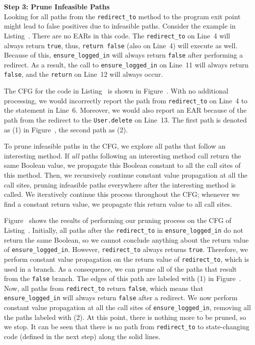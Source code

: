\noindent\textbf{Step 3: Prune Infeasible Paths}\\
Looking for all paths from the \texttt{redirect\_to} method to the program
exit point might lead to false positives due to infeasible paths. Consider
the example in Listing~. There are no EARs in this
code. The \texttt{redirect\_to} on Line~4 will always return \texttt{true},
thus, \texttt{return false} (also on Line~4) will execute as well. Because
of this, \texttt{ensure\_logged\_in} will always return \texttt{false}
after performing a redirect. As a result, the call to
\texttt{ensure\_logged\_in} on Line~11 will always return \texttt{false},
and the \texttt{return} on Line~12 will always occur.

The CFG for the code in Listing~ is shown in
Figure~. With no additional processing, we would
incorrectly report the path from \texttt{redirect\_to} on Line~4 to the
statement in Line~6. Moreover, we would also report an EAR because of the
path from the redirect to the \texttt{User.delete} on Line~13. The first
path is denoted as (1) in Figure~, the second path
as (2).

To prune infeasible paths in the CFG, we explore all paths that follow an
interesting method. If \emph{all} paths following an interesting method
call return the same Boolean value, we propagate this Boolean constant to
all the call sites of this method. Then, we recursively continue constant
value propagation at all the call sites, pruning infeasible paths
everywhere after the interesting method is called. We iteratively continue
this process throughout the CFG; whenever we find a constant return value,
we propagate this return value to all call sites.

Figure~ shows the results of performing our pruning
process on the CFG of Listing~. Initially, all
paths after the \texttt{redirect\_to} in \texttt{ensure\_logged\_in} do not
return the same Boolean, so we cannot conclude anything about the return
value of \texttt{ensure\_logged\_in}. However, \texttt{redirect\_to} always
returns \texttt{true}. Therefore, we perform constant value propagation on
the return value of \texttt{redirect\_to}, which is used in a branch. As a
consequence, we can prune all of the paths that result from the
\texttt{false} branch. The edges of this path are labeled with (1) in
Figure~. Now, all paths from \texttt{redirect\_to}
return \texttt{false}, which means that \texttt{ensure\_logged\_in} will
always return \texttt{false} after a redirect. We now perform constant
value propagation at all the call sites of \texttt{ensure\_logged\_in},
removing all the paths labeled with (2). At this point, there is nothing
more to be pruned, so we stop. It can be seen that there is no path from
\texttt{redirect\_to} to state-changing code (defined in the next step)
along the solid lines. \\

